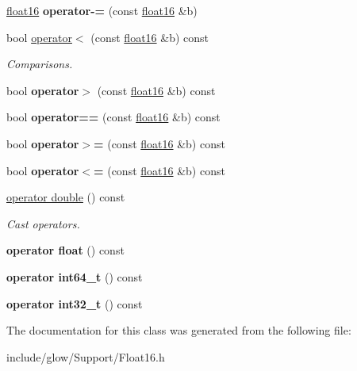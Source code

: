 \begin{DoxyCompactItemize}
\item 
\mbox{\label{classglow_1_1float16_aa5b029e4a1a329431fddb1a3fb02f963}} 
\hyperlink{classglow_1_1float16}{float16} {\bfseries operator-\/=} (const \hyperlink{classglow_1_1float16}{float16} \&b)
\item 
\mbox{\label{classglow_1_1float16_afe81032bf43b5b2f2009f71a5dc3c2c9}} 
bool \hyperlink{classglow_1_1float16_afe81032bf43b5b2f2009f71a5dc3c2c9}{operator$<$} (const \hyperlink{classglow_1_1float16}{float16} \&b) const
\begin{DoxyCompactList}\small\item\em Comparisons. \end{DoxyCompactList}\item 
\mbox{\label{classglow_1_1float16_a884f3d86836581854b0ca6bca5054546}} 
bool {\bfseries operator$>$} (const \hyperlink{classglow_1_1float16}{float16} \&b) const
\item 
\mbox{\label{classglow_1_1float16_a823fdcc1615e00ad5ac3bcebd244c6cc}} 
bool {\bfseries operator==} (const \hyperlink{classglow_1_1float16}{float16} \&b) const
\item 
\mbox{\label{classglow_1_1float16_ad889e21e8ee3dfc09dedeb310a27d76d}} 
bool {\bfseries operator$>$=} (const \hyperlink{classglow_1_1float16}{float16} \&b) const
\item 
\mbox{\label{classglow_1_1float16_a1994e4bcbb02c374d9ae15854cde4fbb}} 
bool {\bfseries operator$<$=} (const \hyperlink{classglow_1_1float16}{float16} \&b) const
\item 
\mbox{\label{classglow_1_1float16_a1c793dac86048ca7d89217b18d3e8897}} 
\hyperlink{classglow_1_1float16_a1c793dac86048ca7d89217b18d3e8897}{operator double} () const
\begin{DoxyCompactList}\small\item\em Cast operators. \end{DoxyCompactList}\item 
\mbox{\label{classglow_1_1float16_a556fdd02327f80c7147bab2fb17d4274}} 
{\bfseries operator float} () const
\item 
\mbox{\label{classglow_1_1float16_a8a52f1c03e7f5dcf50a1a994571c41e5}} 
{\bfseries operator int64\+\_\+t} () const
\item 
\mbox{\label{classglow_1_1float16_acacb83643caefd0d3f5c50d50b634640}} 
{\bfseries operator int32\+\_\+t} () const
\end{DoxyCompactItemize}


The documentation for this class was generated from the following file\+:\begin{DoxyCompactItemize}
\item 
include/glow/\+Support/Float16.\+h\end{DoxyCompactItemize}
